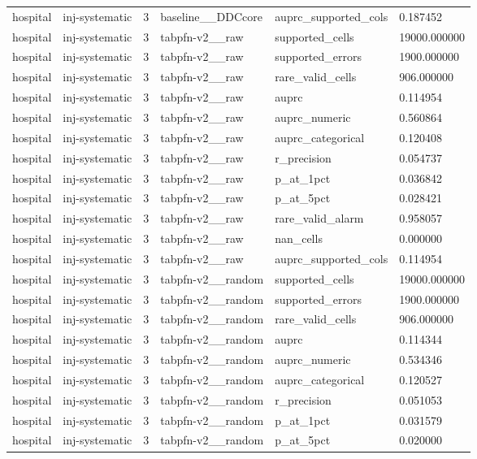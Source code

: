 \begin{tabular}{llllll}
hospital & inj-systematic & 3 & baseline\_\_DDCcore & auprc\_supported\_cols & 0.187452 \\
hospital & inj-systematic & 3 & tabpfn-v2\_\_raw & supported\_cells & 19000.000000 \\
hospital & inj-systematic & 3 & tabpfn-v2\_\_raw & supported\_errors & 1900.000000 \\
hospital & inj-systematic & 3 & tabpfn-v2\_\_raw & rare\_valid\_cells & 906.000000 \\
hospital & inj-systematic & 3 & tabpfn-v2\_\_raw & auprc & 0.114954 \\
hospital & inj-systematic & 3 & tabpfn-v2\_\_raw & auprc\_numeric & 0.560864 \\
hospital & inj-systematic & 3 & tabpfn-v2\_\_raw & auprc\_categorical & 0.120408 \\
hospital & inj-systematic & 3 & tabpfn-v2\_\_raw & r\_precision & 0.054737 \\
hospital & inj-systematic & 3 & tabpfn-v2\_\_raw & p\_at\_1pct & 0.036842 \\
hospital & inj-systematic & 3 & tabpfn-v2\_\_raw & p\_at\_5pct & 0.028421 \\
hospital & inj-systematic & 3 & tabpfn-v2\_\_raw & rare\_valid\_alarm & 0.958057 \\
hospital & inj-systematic & 3 & tabpfn-v2\_\_raw & nan\_cells & 0.000000 \\
hospital & inj-systematic & 3 & tabpfn-v2\_\_raw & auprc\_supported\_cols & 0.114954 \\
hospital & inj-systematic & 3 & tabpfn-v2\_\_random & supported\_cells & 19000.000000 \\
hospital & inj-systematic & 3 & tabpfn-v2\_\_random & supported\_errors & 1900.000000 \\
hospital & inj-systematic & 3 & tabpfn-v2\_\_random & rare\_valid\_cells & 906.000000 \\
hospital & inj-systematic & 3 & tabpfn-v2\_\_random & auprc & 0.114344 \\
hospital & inj-systematic & 3 & tabpfn-v2\_\_random & auprc\_numeric & 0.534346 \\
hospital & inj-systematic & 3 & tabpfn-v2\_\_random & auprc\_categorical & 0.120527 \\
hospital & inj-systematic & 3 & tabpfn-v2\_\_random & r\_precision & 0.051053 \\
hospital & inj-systematic & 3 & tabpfn-v2\_\_random & p\_at\_1pct & 0.031579 \\
hospital & inj-systematic & 3 & tabpfn-v2\_\_random & p\_at\_5pct & 0.020000 \\

\end{tabular}
